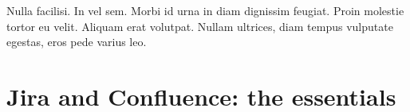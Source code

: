 \begin{savequote}[75mm]
Nulla facilisi. In vel sem. Morbi id urna in diam dignissim feugiat. Proin molestie tortor eu velit. Aliquam erat volutpat. Nullam ultrices, diam tempus vulputate egestas, eros pede varius leo.
\end{savequote}

%

\chapter{Jira and Confluence: the essentials}
\label{chapter_4}
	
